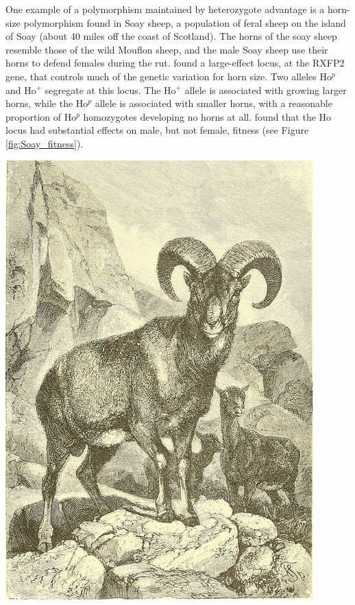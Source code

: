 One example of a polymorphism maintained by heterozygote advantage is
a horn-size polymorphism found in Soay sheep, a population of feral sheep on the island of Soay
(about 40 miles off the coast of Scotland).  The horns of the soay sheep resemble
those of the wild Mouflon sheep, and the male Soay sheep use their horns to defend females during
the rut. \citet{johnston2013life} found a large-effect locus,  at the
RXFP2 gene, that controls much of the genetic variation for horn size. Two
alleles Ho$^p$ and Ho$^+$ segregate at this locus. The Ho$^+$ allele is associated with
growing larger horns, while the Ho$^p$ allele is associated with smaller
horns, with a reasonable proportion of Ho$^p$ homozygotes developing no
horns at all. \citet{johnston2013life} found that the Ho locus had substantial
effects on male, but not female, fitness (see Figure
\ref{fig:Soay_fitness}). \begin{marginfigure}
\begin{center}
  \includegraphics[width = \textwidth]{illustration_images/single_locus_selection/mouflon/18195657882_eb207e4e9e_z.jpg}

\end{center}
\end{marginfigure}
